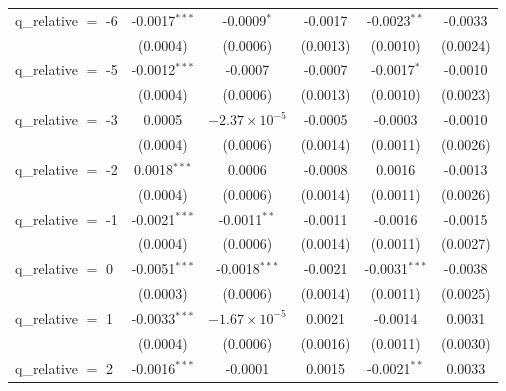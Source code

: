\begin{tabular}{lccccc}
   q\_relative $=$ -6   & -0.0017$^{***}$ & -0.0009$^{*}$          & -0.0017           & -0.0023$^{**}$                & -0.0033\\   
                        & (0.0004)        & (0.0006)               & (0.0013)          & (0.0010)                      & (0.0024)\\   
   q\_relative $=$ -5   & -0.0012$^{***}$ & -0.0007                & -0.0007           & -0.0017$^{*}$                 & -0.0010\\   
                        & (0.0004)        & (0.0006)               & (0.0013)          & (0.0010)                      & (0.0023)\\   
   q\_relative $=$ -3   & 0.0005          & $-2.37\times 10^{-5}$  & -0.0005           & -0.0003                       & -0.0010\\   
                        & (0.0004)        & (0.0006)               & (0.0014)          & (0.0011)                      & (0.0026)\\   
   q\_relative $=$ -2   & 0.0018$^{***}$  & 0.0006                 & -0.0008           & 0.0016                        & -0.0013\\   
                        & (0.0004)        & (0.0006)               & (0.0014)          & (0.0011)                      & (0.0026)\\   
   q\_relative $=$ -1   & -0.0021$^{***}$ & -0.0011$^{**}$         & -0.0011           & -0.0016                       & -0.0015\\   
                        & (0.0004)        & (0.0006)               & (0.0014)          & (0.0011)                      & (0.0027)\\   
   q\_relative $=$ 0    & -0.0051$^{***}$ & -0.0018$^{***}$        & -0.0021           & -0.0031$^{***}$               & -0.0038\\   
                        & (0.0003)        & (0.0006)               & (0.0014)          & (0.0011)                      & (0.0025)\\   
   q\_relative $=$ 1    & -0.0033$^{***}$ & $-1.67\times 10^{-5}$  & 0.0021            & -0.0014                       & 0.0031\\   
                        & (0.0004)        & (0.0006)               & (0.0016)          & (0.0011)                      & (0.0030)\\   
   q\_relative $=$ 2    & -0.0016$^{***}$ & -0.0001                & 0.0015            & -0.0021$^{**}$                & 0.0033\\   

\end{tabular}
